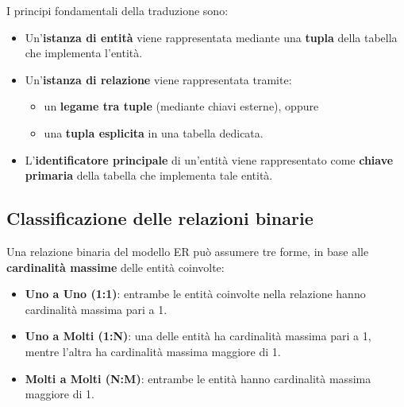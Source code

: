 I principi fondamentali della traduzione sono:
\begin{itemize}
    \item Un’\textbf{istanza di entità} viene rappresentata mediante una \textbf{tupla} della tabella che implementa l’entità.
    \item Un’\textbf{istanza di relazione} viene rappresentata tramite:
    \begin{itemize}
        \item un \textbf{legame tra tuple} (mediante chiavi esterne), oppure
        \item una \textbf{tupla esplicita} in una tabella dedicata.
    \end{itemize}
    \item L’\textbf{identificatore principale} di un’entità viene rappresentato come \textbf{chiave primaria} della tabella che implementa tale entità.
\end{itemize}
\subsection{Classificazione delle relazioni binarie}

Una relazione binaria del modello ER può assumere tre forme, in base alle \textbf{cardinalità massime} delle entità coinvolte:

\begin{itemize}
    \item \textbf{Uno a Uno (1:1)}:  
    entrambe le entità coinvolte nella relazione hanno cardinalità massima pari a 1.

    \item \textbf{Uno a Molti (1:N)}:  
    una delle entità ha cardinalità massima pari a 1, mentre l’altra ha cardinalità massima maggiore di 1.

    \item \textbf{Molti a Molti (N:M)}:  
    entrambe le entità hanno cardinalità massima maggiore di 1.
\end{itemize}
